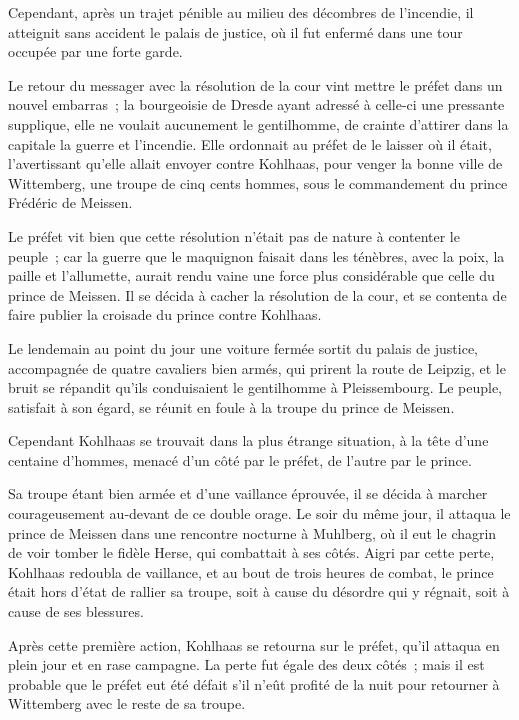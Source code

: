 \documentclass[french,twoside]{book} %
\begin{document}
Cependant, après un trajet pénible au milieu des décombres de l’incendie, il atteignit sans accident le palais de justice, où il fut enfermé dans une tour occupée par une forte garde.\par
Le retour du messager avec la résolution de la cour vint mettre le préfet dans un nouvel embarras ; la bourgeoisie de Dresde ayant adressé à celle-ci une pressante supplique, elle ne voulait aucunement le gentilhomme, de crainte d’attirer dans la capitale la guerre et l’incendie. Elle ordonnait au préfet de le laisser où il était, l’avertissant qu’elle allait envoyer contre Kohlhaas, pour venger la bonne ville de Wittemberg, une troupe de cinq cents hommes, sous le commandement du prince Frédéric de Meissen.\par
Le préfet vit bien que cette résolution n’était pas de nature à contenter le peuple ; car la guerre que le maquignon faisait dans les ténèbres, avec la poix, la paille et l’allumette, aurait rendu vaine une force plus considérable que celle du prince de Meissen. Il se décida à cacher la résolution de la cour, et se contenta de faire publier la croisade du prince contre Kohlhaas.\par
Le lendemain au point du jour une voiture fermée sortit du palais de justice, accompagnée de quatre cavaliers bien armés, qui prirent la route de Leipzig, et le bruit se répandit qu’ils conduisaient le gentilhomme à Pleissembourg. Le peuple, satisfait à son égard, se réunit en foule à la troupe du prince de Meissen.\par
Cependant Kohlhaas se trouvait dans la plus étrange situation, à la tête d’une centaine d’hommes, menacé d’un côté par le préfet, de l’autre par le prince.\par
Sa troupe étant bien armée et d’une vaillance éprouvée, il se décida à marcher courageusement au-devant de ce double orage. Le soir du même jour, il attaqua le prince de Meissen dans une rencontre nocturne à Muhlberg, où il eut le chagrin de voir tomber le fidèle Herse, qui combattait à ses côtés. Aigri par cette perte, Kohlhaas redoubla de vaillance, et au bout de trois heures de combat, le prince était hors d’état de rallier sa troupe, soit à cause du désordre qui y régnait, soit à cause de ses blessures.\par
Après cette première action, Kohlhaas se retourna sur le préfet, qu’il attaqua en plein jour et en rase campagne. La perte fut égale des deux côtés ; mais il est probable que le préfet eut été défait s’il n’eût profité de la nuit pour retourner à Wittemberg avec le reste de sa troupe.\par
\end{document}
